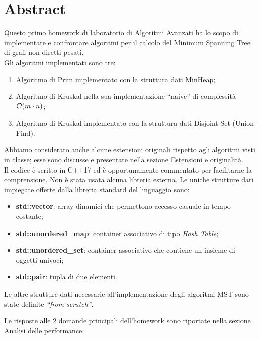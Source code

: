 \section{Abstract}
\label{cap:abstract}

Questo primo homework di laboratorio di Algoritmi Avanzati ha lo scopo di implementare e confrontare algoritmi per il calcolo del Minimum Spanning Tree di grafi non diretti pesati. \\

\noindent Gli algoritmi implementati sono tre:

\begin{enumerate}
    \item Algoritmo di Prim implementato con la struttura dati MinHeap;
    \item Algoritmo di Kruskal nella sua implementazione ``naive'' di complessità $\mathcal{O}(m \cdot n)$;
    \item Algoritmo di Kruskal implementato con la struttura dati Disjoint-Set (Union-Find).
\end{enumerate}

\noindent Abbiamo considerato anche alcune estensioni originali rispetto agli algoritmi visti in classe; esse sono discusse e presentate nella sezione \hyperref[cap:extensions-and-originalities]{Estensioni e originalità}. \\

\noindent Il codice è scritto in C++17 ed è opportunamente commentato per facilitarne la comprensione. Non è stata usata alcuna libreria esterna. Le uniche strutture dati impiegate offerte dalla libreria standard del linguaggio sono:

\begin{itemize}
    \item \textbf{std::vector}: array dinamici che permettono accesso casuale in tempo costante;
    \item \textbf{std::unordered\_map}: container associativo di tipo \textit{Hash Table};
    \item \textbf{std::unordered\_set}: container associativo che contiene un insieme di oggetti univoci;
    \item \textbf{std::pair}: tupla di due elementi.
\end{itemize}
Le altre strutture dati necessarie all'implementazione degli algoritmi MST sono state definite \textit{``from scratch''}.

\noindent Le risposte alle 2 domande principali dell'homework sono riportate nella sezione \hyperref[cap:performance-analysis]{Analisi delle performance}.
